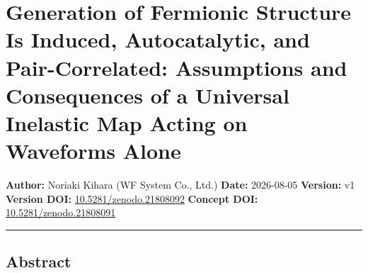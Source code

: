\documentclass[
  a4paper,
]{article}
\author{}
\date{}
\begin{document}
\section{Generation of Fermionic Structure Is Induced, Autocatalytic,
and Pair-Correlated: Assumptions and Consequences of a Universal
Inelastic Map Acting on Waveforms
Alone}\label{generation-of-fermionic-structure-is-induced-autocatalytic-and-pair-correlated-assumptions-and-consequences-of-a-universal-inelastic-map-acting-on-waveforms-alone}

\textbf{Author:} Noriaki Kihara (WF System Co., Ltd.) \textbf{Date:}
2026-08-05 \textbf{Version:} v1 \textbf{Version DOI:}
\href{https://doi.org/10.5281/zenodo.21808092}{10.5281/zenodo.21808092}
\textbf{Concept DOI:}
\href{https://doi.org/10.5281/zenodo.21808091}{10.5281/zenodo.21808091}

\begin{center}\rule{0.5\linewidth}{0.5pt}\end{center}

\subsection{Abstract}\label{abstract}
\end{document}

